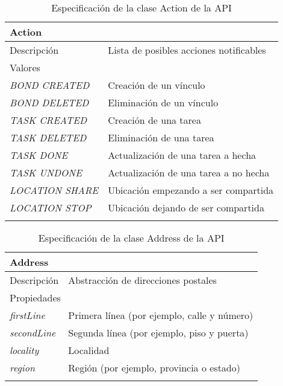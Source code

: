 \begin{longtable}{|p{} p{}|}
    \hline
    \multicolumn{2}{|l|}{Action} \\ \hline \hline
    Descripción      & Lista de posibles acciones notificables \\ \hline
    \multicolumn{2}{|l|}{Valores} \\
    \emph{BOND CREATED}  & Creación de un vínculo  \\
    \emph{BOND DELETED}  & Eliminación de un vínculo  \\
    \emph{TASK CREATED}  & Creación de una tarea  \\
    \emph{TASK DELETED}  & Eliminación de una tarea  \\
    \emph{TASK DONE}  & Actualización de una tarea a hecha  \\
    \emph{TASK UNDONE}  & Actualización de una tarea a no hecha  \\
    \emph{LOCATION SHARE}  & Ubicación empezando a ser compartida  \\
    \emph{LOCATION STOP}  & Ubicación dejando de ser compartida  \\ \hline
    \caption{Especificación de la clase Action de la API}
    \label{class:api:action}
\end{longtable}

\begin{longtable}{|p{} p{}|}
    \hline
    \multicolumn{2}{|l|}{Address} \\ \hline \hline
    Descripción      & Abstracción de direcciones postales \\ \hline
    \multicolumn{2}{|l|}{Propiedades} \\
    \emph{firstLine}  & Primera línea (por ejemplo, calle y número)  \\
    \emph{secondLine}  & Segunda línea (por ejemplo, piso y puerta)  \\
    \emph{locality}  & Localidad  \\
    \emph{region}  & Región (por ejemplo, provincia o estado)  \\ \hline
    \caption{Especificación de la clase Address de la API}
    \label{class:api:address}
\end{longtable}

